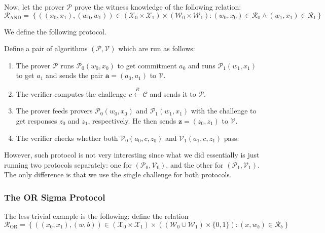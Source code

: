 \documentclass[../lecture-notes.tex]{subfiles}
\begin{document}
Now, let the prover $\mathcal{P}$ prove the witness knowledge of the following relation:
\begin{equation*}
    \mathcal{R}_{\text{AND}} = \left\{ ((x_0,x_1), (w_0,w_1)) \in (\mathcal{X}_0 \times \mathcal{X}_1) \times (\mathcal{W}_0 \times \mathcal{W}_1): (w_0,x_0) \in \mathcal{R}_0 \wedge (w_1,x_1) \in \mathcal{R}_1 \right\}
\end{equation*}

We define the following protocol.

\begin{definition}
    Define a pair of algorithms $(\mathcal{P},\mathcal{V})$ which are run as follows:
    \begin{enumerate}
        \item The prover $\mathcal{P}$ runs $\mathcal{P}_0(w_0,x_0)$ to get commitment $a_0$ and runs $\mathcal{P}_1(w_1,x_1)$ to get $a_1$ and sends the pair $\mathbf{a} = (a_0,a_1)$ to $\mathcal{V}$.
        \item The verifier computes the challenge $c \xleftarrow{R} \mathcal{C}$ and sends it to $\mathcal{P}$.
        \item The prover feeds provers $\mathcal{P}_0(w_0,x_0)$ and $\mathcal{P}_1(w_1,x_1)$ with the challenge to get responses $z_0$ and $z_1$, respectively. He then sends $\mathbf{z} = (z_0,z_1)$ to $\mathcal{V}$.
        \item The verifier checks whether both $\mathcal{V}_0(a_0,c,z_0)$ and $\mathcal{V}_1(a_1,c,z_1)$ pass.
    \end{enumerate}
\end{definition}

However, such protocol is not very interesting since what we did essentially is just running two protocols separately: one for $(\mathcal{P}_0,\mathcal{V}_0)$, and the other for $(\mathcal{P}_1,\mathcal{V}_1)$. The only difference is that we use the single challenge for both protocols.

\subsubsection{The OR Sigma Protocol}

The less trivial example is the following: define the relation
\begin{equation*}
    \mathcal{R}_{\text{OR}} = \left\{ ((x_0, x_1), (w, b)) \in (\mathcal{X}_0 \times \mathcal{X}_1) \times ((\mathcal{W}_0 \cup \mathcal{W}_1) \times \{0,1\}): (x, w_b) \in \mathcal{R}_b \right\}
\end{equation*}
\end{document}
